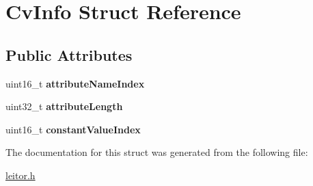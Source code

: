 \hypertarget{structCvInfo}{}\section{Cv\+Info Struct Reference}
\label{structCvInfo}
\subsection*{Public Attributes}
\begin{DoxyCompactItemize}
\item 
\mbox{\label{structCvInfo_ab33f866a4dfccc3684b00cadde84aec4}} 
uint16\+\_\+t {\bfseries attribute\+Name\+Index}
\item 
\mbox{\label{structCvInfo_a58d31f430ddf05c081616479997ebf34}} 
uint32\+\_\+t {\bfseries attribute\+Length}
\item 
\mbox{\label{structCvInfo_a44e05b3248c82f0c649a36cd66098e4c}} 
uint16\+\_\+t {\bfseries constant\+Value\+Index}
\end{DoxyCompactItemize}


The documentation for this struct was generated from the following file\+:\begin{DoxyCompactItemize}
\item 
\mbox{\hyperlink{leitor_8h}{leitor.\+h}}\end{DoxyCompactItemize}
